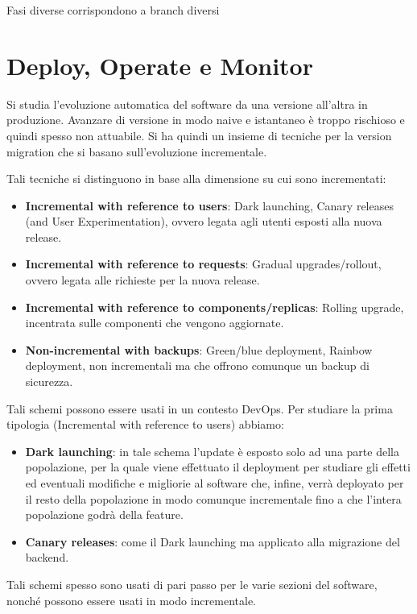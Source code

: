 Fasi diverse corrispondono a branch diversi
\section{Deploy, Operate e Monitor}
Si studia l'evoluzione automatica del software da una versione all'altra in
produzione. Avanzare di versione in modo naive e istantaneo è troppo rischioso e
quindi spesso non attuabile. Si ha quindi un insieme di tecniche per la version
migration che si basano sull'evoluzione incrementale.

Tali tecniche si distinguono in base alla dimensione su cui sono incrementati:
\begin{itemize}
      \item \textbf{Incremental with reference to users}: Dark launching, Canary
            releases (and User Experimentation), ovvero legata agli utenti esposti
            alla nuova release.
      \item \textbf{Incremental with reference to requests}: Gradual upgrades/rollout,
            ovvero legata alle richieste per la nuova release.
      \item \textbf{Incremental with reference to components/replicas}: Rolling
            upgrade, incentrata sulle componenti che vengono aggiornate.
      \item \textbf{Non-incremental with backups}: Green/blue deployment,
            Rainbow deployment, non incrementali ma che offrono comunque un backup
            di sicurezza.
\end{itemize}
Tali schemi possono essere usati in un contesto DevOps. Per studiare la prima
tipologia (Incremental with reference to users) abbiamo:
\begin{itemize}
      \item \textbf{Dark launching}: in tale schema l'update è esposto solo ad una
            parte della popolazione, per la quale viene effettuato il deployment
            per studiare gli effetti ed eventuali modifiche e migliorie al
            software che, infine, verrà deployato per il resto della popolazione
            in modo comunque incrementale fino a che l'intera popolazione godrà
            della feature.
      \item \textbf{Canary releases}: come il Dark launching ma applicato alla
            migrazione del backend.
\end{itemize}
Tali schemi spesso sono usati di pari passo per le varie sezioni del software,
nonché possono essere usati in modo incrementale.

